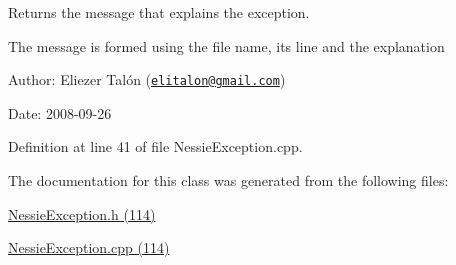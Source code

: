 Returns the message that explains the exception. 

The message is formed using the file name, its line and the explanation

\begin{Desc}
\item[Author:]Eliezer Talón (\href{mailto:elitalon@gmail.com}{\tt elitalon@gmail.com}) \end{Desc}
\begin{Desc}
\item[Date:]2008-09-26 \end{Desc}


Definition at line 41 of file NessieException.cpp.

The documentation for this class was generated from the following files:\begin{CompactItemize}
\item 
\hyperlink{_nessie_exception_8h}{NessieException.h (114)}\item 
\hyperlink{_nessie_exception_8cpp}{NessieException.cpp (114)}\end{CompactItemize}
